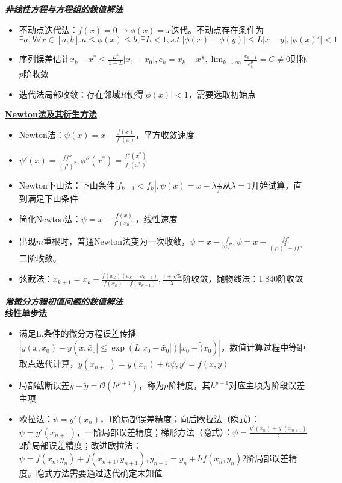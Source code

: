 \documentclass[UTF8,a4paper,landscape,8pt]{paper}
\renewcommand{\subsection}[1]{{\small\textbf{\underline{#1}}}\\ }
\renewcommand{\section}[1]{{\normalsize\textbf{\emph{#1}}}\\ }
\newcommand{\List}[1]{\begin{itemize}[fullwidth,itemindent=0em] #1 \end{itemize}}
\begin{document}
\begin{multicols}{4}
\section{非线性方程与方程组的数值解法}
    \List{
        \item {不动点迭代法：$f(x) = 0 \rightarrow \phi(x) = x$迭代。不动点存在条件为$\exists a,b\forall x \in [a,b]. a \le \phi(x) \le b, \exists L < 1, s.t. |\phi(x)-\phi(y)| \le L|x-y|, |\phi(x)'| < 1$}
        \item {序列误差估计$x_k-x^* \le \frac {L^k}{1-L}|x_1-x_0|, e_k = x_k - x*, \lim_{k\to\infty} \frac{e_{k+1}}{e_k^p} = C \ne 0$则称$p$阶收敛}
        \item {迭代法局部收敛：存在邻域$R$使得$|\phi(x)| < 1$，需要选取初始点}
    }
    \subsection{Newton法及其衍生方法}
    \List{
        \item {Newton法：$\psi(x) =x - \frac{f(x)}{f'(x)}$，平方收敛速度}
        \item {$\psi'(x) = \frac{ff''}{(f')^2},\phi''(x^*) = \frac{f''(x^*)}{f'(x^*)}$}
        \item {Newton下山法：下山条件$|f_{k+1} < f_k|, \psi(x) = x-\lambda \frac f{f'}$从$\lambda=1$开始试算，直到满足下山条件}
        \item {简化Newton法：$\psi = x - \frac{f(x)}{f'(x_0)}$，线性速度}
        \item {出现$m$重根时，普通Newton法变为一次收敛，$\psi = x -\frac f {mf'},\psi = x - \frac{ff'}{(f')^2 - ff''}$二阶收敛。}
        \item {弦截法：$x_{k+1} = x_k -\frac{f(x_k)(x_k - x_{k-1})}{f(x_k) - f(x_{k-1})},\frac{1+\sqrt 5}2$阶收敛，抛物线法：1.840阶收敛}
    }
\section{常微分方程初值问题的数值解法}
    \subsection{线性单步法}
    \List{
        \item {满足L.条件的微分方程误差传播$|y(x,x_0) - y(x,\widetilde{x_0}| \le \exp(L|x_0 - \widetilde{x_0}|)|x_0 - \widetilde(x_0)|$，数值计算过程中等距取点迭代计算，$y(x_{n+1}) = y(x_n) + h\psi, y'=f(x,y)$}
        \item {局部截断误差$y -\widetilde y =\mathcal O(h^{p+1})$，称为$p$阶精度，其$h^{p+1}$对应主项为阶段误差主项}
        \item {欧拉法：$\psi =y'(x_n)$，1阶局部误差精度；向后欧拉法（隐式）：$\psi = y'(x_{n+1})$，一阶局部误差精度；梯形方法（隐式）：$\psi = \frac{y'(x_n) + y'(x_{n+1})}{2}$2阶局部误差精度；改进欧拉法：$\psi = f(x_n,y_n) + f(x_{n+1},\overline{y_{n+1}}),\overline{y_{n+1}} = y_n + hf(x_n,y_n)$2阶局部误差精度。隐式方法需要通过迭代确定未知值}
    }

\end{multicols}
\end{document}
